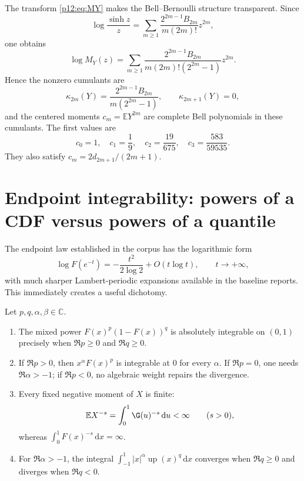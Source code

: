 \documentclass[11pt,oneside]{article}
\theoremstyle{definition}
\theoremstyle{remark}
\newcommand{\F}{F}
\newcommand{\Up}{\operatorname{up}}
\newcommand{\E}{\mathbb E}
\newcommand{\C}{\mathbb C}
\newcommand{\dd}{\,\mathrm d}
\newcommand{\1}{\mathbf 1}
\begin{document}
The transform \eqref{p12:eq:MY} makes the Bell--Bernoulli structure transparent.
Since
\[
 \log\frac{\sinh z}{z}
 =\sum_{m\ge1}\frac{2^{2m-1}B_{2m}}{m(2m)!}z^{2m},
\]
one obtains
\begin{equation}\label{p12:eq:cumulants}
 \log M_Y(z)
 =\sum_{m\ge1}
 \frac{2^{2m-1}B_{2m}}{m(2m)!(2^{2m}-1)}z^{2m}.
\end{equation}
Hence the nonzero cumulants are
\begin{equation}
 \kappa_{2m}(Y)=
 \frac{2^{2m-1}B_{2m}}{m(2^{2m}-1)},
 \qquad \kappa_{2m+1}(Y)=0,
\end{equation}
and the centered moments
\(c_m=\E Y^{2m}\) are complete Bell polynomials in these cumulants.  The first
values are
\[
 c_0=1,\quad c_1=\frac19,\quad c_2=\frac{19}{675},\quad
 c_3=\frac{583}{59535}.
\]
They also satisfy \(c_m=2d_{2m+1}/(2m+1)\).

\section{Endpoint integrability: powers of a CDF versus powers of a quantile}

The endpoint law established in the corpus has the logarithmic form
\begin{equation}\label{p12:eq:endpointlog}
 \log\F(e^{-t})=-\frac{t^2}{2\log2}+O(t\log t),
 \qquad t\to+\infty,
\end{equation}
with much sharper Lambert-periodic expansions available in the baseline
reports.  This immediately creates a useful dichotomy.

\begin{proposition}\label{p12:prop:integrability}
Let \(p,q,\alpha,\beta\in\C\).
\begin{enumerate}[label=(\roman*)]
 \item The mixed power
 \(\F(x)^p(1-\F(x))^q\) is absolutely integrable on \((0,1)\) precisely when
 \(\Re p\ge0\) and \(\Re q\ge0\).
 \item If \(\Re p>0\), then \(x^\alpha\F(x)^p\) is integrable at \(0\) for
 every \(\alpha\).  If \(\Re p=0\), one needs \(\Re\alpha>-1\); if
 \(\Re p<0\), no algebraic weight repairs the divergence.
 \item Every fixed negative moment of \(X\) is finite:
 \[
   \E X^{-s}=\int_0^1\G(u)^{-s}\dd u<\infty\qquad(s>0),
 \]
 whereas \(\int_0^1\F(x)^{-s}\dd x=\infty\).
 \item For \(\Re\alpha>-1\), the integral
 \(\int_{-1}^1|x|^\alpha\Up(x)^q\dd x\) converges when \(\Re q\ge0\) and
 diverges when \(\Re q<0\).
\end{enumerate}
\end{proposition}
\end{document}

